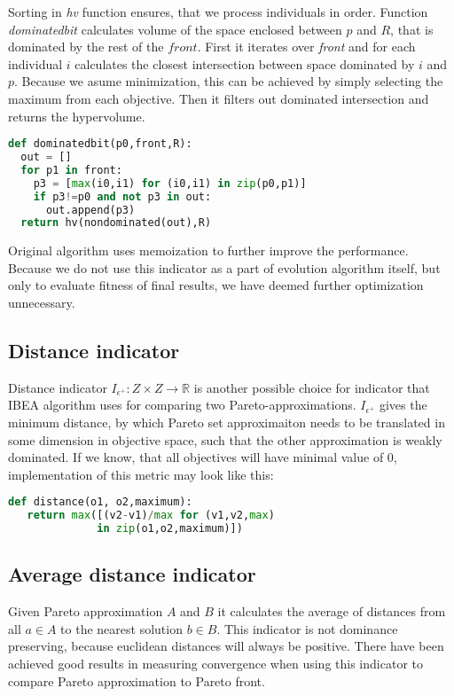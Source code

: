 \documentclass[12pt,oneside]{fithesis2}
\begin{document}
Sorting in \emph{hv} function ensures, that we process individuals in order. Function \emph{dominatedbit} calculates volume of the space enclosed between $p$ and $R$, that is dominated by the rest of the $front$. First it iterates over \emph{front} and for each individual $i$ calculates the closest intersection between space dominated by $i$ and $p$. Because we asume minimization, this can be achieved by simply selecting the maximum from each objective. Then it filters out dominated intersection and returns the hypervolume.

\begin{lstlisting}[language=Python,label=eps_example,caption=Calculation of intersecting hypervolumes]
def dominatedbit(p0,front,R):
  out = []
  for p1 in front:
    p3 = [max(i0,i1) for (i0,i1) in zip(p0,p1)]
    if p3!=p0 and not p3 in out:
      out.append(p3)
  return hv(nondominated(out),R)
\end{lstlisting}

Original algorithm\cite{russo2012quick} uses memoization to further improve the performance. Because we do not use this indicator as a part of evolution algorithm itself, but only to evaluate fitness of final results, we have deemed further optimization unnecessary. 

\subsection{Distance indicator}
Distance indicator $I_{\epsilon^{+}}: Z \times Z \to  \mathbb{R}$ is another possible choice for indicator that IBEA algorithm uses for comparing two Pareto-approximations. $I_{\epsilon^{+}}$ gives the minimum distance, by which Pareto set approximaiton needs to be translated in some dimension in objective space, such that the other approximation is weakly dominated. If we know, that all objectives will have minimal value of 0, implementation of this metric may look like this:

\begin{lstlisting}[language=Python,label=eps_example,caption=Distance indicator implementation]
def distance(o1, o2,maximum):
   return max([(v2-v1)/max for (v1,v2,max) 
              in zip(o1,o2,maximum)])
\end{lstlisting}

\subsection{Average distance indicator}
Given Pareto approximation $A$ and $B$ it calculates the average of distances from all $a \in A$ to the nearest solution $b \in B$. This indicator is not dominance preserving, because euclidean distances will always be positive. There have been achieved good results in measuring convergence when using this indicator to compare Pareto approximation to Pareto front\cite{stehl2013opt}.
\end{document}
